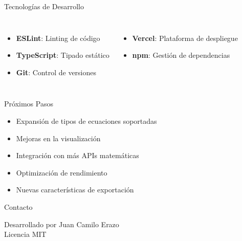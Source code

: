 \documentclass[aspectratio=169]{beamer}
\begin{document}
\begin{frame}{Tecnologías de Desarrollo}
    \begin{columns}
        \begin{itemize}
            \item \textbf{ESLint}: Linting de código
            \item \textbf{TypeScript}: Tipado estático
            \item \textbf{Git}: Control de versiones
        \end{itemize}
        
        \begin{itemize}
            \item \textbf{Vercel}: Plataforma de despliegue
            \item \textbf{npm}: Gestión de dependencias
        \end{itemize}
    \end{columns}
\end{frame}

\begin{frame}{Próximos Pasos}
    \begin{itemize}
        \item Expansión de tipos de ecuaciones soportadas
        \item Mejoras en la visualización
        \item Integración con más APIs matemáticas
        \item Optimización de rendimiento
        \item Nuevas características de exportación
    \end{itemize}
\end{frame}

\begin{frame}{Contacto}
    \begin{center}
        \large
        Desarrollado por Juan Camilo Erazo\\
        \vspace{0.5cm}
        Licencia MIT
    \end{center}
\end{frame}
\end{document}
